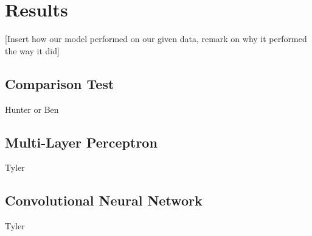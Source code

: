 \section{Results}
\label{sec:results}
[Insert how our model performed on our given data, remark on why it performed the way it did]
\subsection{Comparison Test}
Hunter or Ben
\subsection{Multi-Layer Perceptron}
Tyler
\subsection{Convolutional Neural Network}
Tyler

